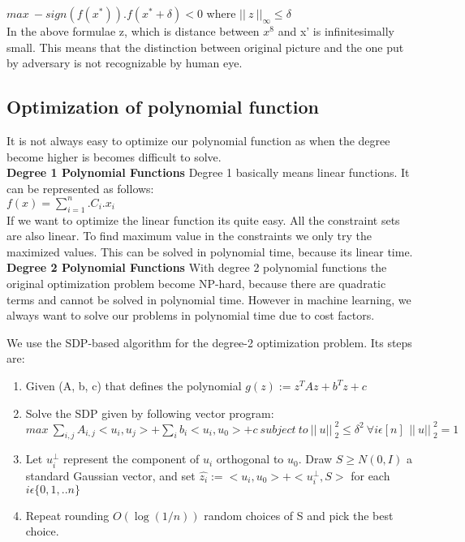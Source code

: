 \documentclass[12pt]{article}
\begin{document}
    $max~ -sign(f(x^*)).f(x^*+\delta)<0$ where ${\vert \vert\ z ~\vert \vert}_\infty \leq \delta$ \\
    
    In the above formulae z, which is distance between $x^8$ and x' is infinitesimally small. This means that the distinction between original picture and the one put by adversary is not recognizable by human eye.
    \subsection{Optimization of polynomial function}
    It is not always easy to optimize our polynomial function as when the degree become higher is becomes difficult to solve.\\
    
    \textbf{Degree 1 Polynomial Functions}
    Degree 1 basically means linear functions. It can be represented as follows:\\
    
    $f(x)= \sum^n_{i=1}.C_i.x_i$
    \\
    If we want to optimize the linear function its quite easy. All the constraint sets are also linear. To find maximum value in the constraints we only try the maximized values. This can be solved in polynomial time, because its linear time.\\
    
    \textbf{Degree 2 Polynomial Functions}
    With degree 2 polynomial functions the original optimization problem become NP-hard, because there are quadratic terms and cannot be solved in polynomial time. However in machine learning, we always want to solve our problems in polynomial time due to cost factors.
    
     We use the SDP-based algorithm for the degree-2 optimization problem. Its steps are:
    \begin{enumerate}
    \item Given (A, b, c) that defines the polynomial $g(z):=z^TAz+b^Tz+c$
    \item Solve the SDP given by following vector program: \\
    $max~\sum_{i,j}A_{i,j}<u_i,u_j>+\sum_i b_i <u_i,u_0>+c~subject~to~ {\vert \vert\ u\vert \vert\ }_2^2\leq \delta^2~\forall i \epsilon [n]\,~{\vert \vert\ u\vert \vert\ }^2_2=1 $
    \item Let $u_i^\bot$ represent the component of $u_i$ orthogonal to $u_0$. Draw $S \geq N(0, I)$ a standard Gaussian vector, and set $\hat{z_i}:=<u_i,u_0>+<u_i^\bot,S>$ for each $i \epsilon\{0,1,..n\}$
    \item Repeat rounding $O(\log(1/n))$ random choices of S and pick the best choice.
    \end{enumerate}
     
\end{document}

